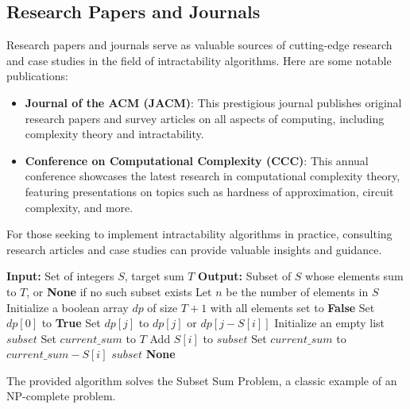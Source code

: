 \subsection{Research Papers and Journals}
Research papers and journals serve as valuable sources of cutting-edge research and case studies in the field of intractability algorithms. Here are some notable publications:

\begin{itemize}
    \item \textbf{Journal of the ACM (JACM)}: This prestigious journal publishes original research papers and survey articles on all aspects of computing, including complexity theory and intractability.
    \item \textbf{Conference on Computational Complexity (CCC)}: This annual conference showcases the latest research in computational complexity theory, featuring presentations on topics such as hardness of approximation, circuit complexity, and more.
\end{itemize}

For those seeking to implement intractability algorithms in practice, consulting research articles and case studies can provide valuable insights and guidance.

\FloatBarrier
\begin{algorithm}
\caption{Example Algorithm: Subset Sum Problem}
\begin{algorithmic}[1]
\State \textbf{Input:} Set of integers $S$, target sum $T$
\State \textbf{Output:} Subset of $S$ whose elements sum to $T$, or \textbf{None} if no such subset exists
\State Let $n$ be the number of elements in $S$
\State Initialize a boolean array $dp$ of size $T+1$ with all elements set to \textbf{False}
\State Set $dp[0]$ to \textbf{True}
        \State Set $dp[j]$ to $dp[j]$ or $dp[j - S[i]]$
    \EndFor
\EndFor
{}
    \State Initialize an empty list $subset$
    \State Set $current\_sum$ to $T$
            \State Add $S[i]$ to $subset$
            \State Set $current\_sum$ to $current\_sum - S[i]$
        \EndIf
    \EndFor
    \Return $subset$
\Else
    \Return \textbf{None}
\EndIf
\end{algorithmic}
\end{algorithm}
\FloatBarrier

The provided algorithm solves the Subset Sum Problem, a classic example of an NP-complete problem.
